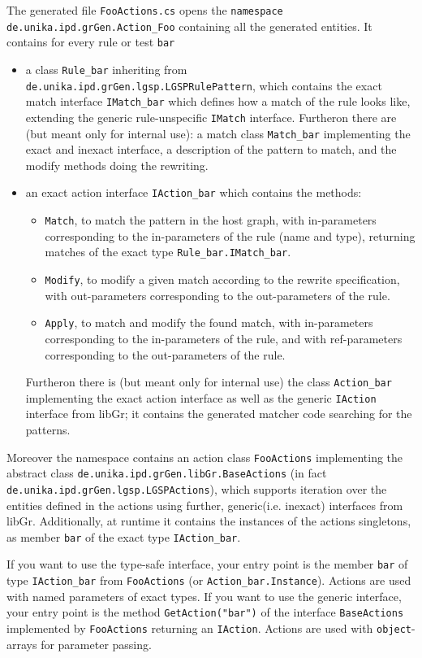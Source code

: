 The generated file \texttt{FooActions.cs} opens the \texttt{namespace de.unika.ipd.grGen.Action\_Foo} containing all the generated entities.
It contains for every rule or test \texttt{bar}
\begin{itemize}
\item a class \texttt{Rule\_bar} inheriting from \texttt{de.unika.ipd.grGen.lgsp.LGSPRulePattern}, which contains
the exact match interface \texttt{IMatch\_bar} which defines how a match of the rule looks like,
extending the generic rule-unspecific \texttt{IMatch} interface.
Furtheron there are (but meant only for internal use): a match class \texttt{Match\_bar} implementing the exact and inexact interface,
a description of the pattern to match, and the modify methods doing the rewriting.
\item an exact action interface \texttt{IAction\_bar} which contains the methods:
  \begin{itemize}
  \item \texttt{Match}, to match the pattern in the host graph,
     with in-parameters corresponding to the in-parameters of the rule (name and type),
	 returning matches of the exact type \texttt{Rule\_bar.IMatch\_bar}.
  \item \texttt{Modify}, to modify a given match according to the rewrite specification,
     with out-parameters corresponding to the out-parameters of the rule.
  \item \texttt{Apply}, to match and modify the found match,
     with in-parameters corresponding to the in-parameters of the rule,
     and with ref-parameters corresponding to the out-parameters of the rule.
  \end{itemize}
  Furtheron there is (but meant only for internal use) the class \texttt{Action\_bar} implementing the exact action interface as well as the generic \texttt{IAction} interface from libGr;
  it contains the generated matcher code searching for the patterns.
\end{itemize}

Moreover the namespace contains an action class \texttt{FooActions}
implementing the abstract class \texttt{de.unika.ipd.grGen.libGr.BaseActions} (in fact \texttt{de.unika.ipd.grGen.lgsp.LGSPActions}),
which supports iteration over the entities defined in the actions using further, generic(i.e. inexact) interfaces from libGr.
Additionally, at runtime it contains the instances of the actions singletons,
as member \texttt{bar} of the exact type \texttt{IAction\_bar}.
\begin{note}
If you want to use the type-safe interface, your entry point is the member \texttt{bar} of type \texttt{IAction\_bar} from \texttt{FooActions} (or \texttt{Action\_bar.Instance}).
Actions are used with named parameters of exact types.
If you want to use the generic interface, your entry point is the method \texttt{GetAction("bar")} of the interface \texttt{BaseActions} implemented by \texttt{FooActions} returning an \texttt{IAction}.
Actions are used with \texttt{object}-arrays for parameter passing.
\end{note}

